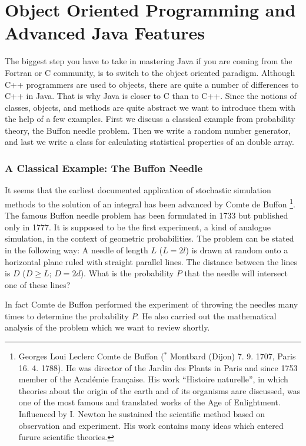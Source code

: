 \chapter{Object Oriented Programming and Advanced Java Features}
\label{sec:objectoriented}

The biggest step you have to take in mastering Java if you are
coming from the Fortran or C community, is to switch to the object
oriented paradigm. Although C++ programmers are used to objects, there
are quite a number of differences to C++ in Java. That is why Java
is closer to C than to C++. Since the notions of classes, objects, and
methods are quite abstract we want to introduce them with the help of
a few examples. First we discuss a classical example from probability theory,
the Buffon needle problem. Then we write a random number 
generator, and last we write a class for calculating 
statistical properties of an double array.  


\subsection{A Classical Example: The Buffon Needle}

It seems that the earliest documented application of stochastic simulation
methods to the solution of an integral has been advanced by Comte de
Buffon \footnote{Georges Loui Leclerc Comte de Buffon ($^*$ Montbard
  (Dijon) 7. 9. 1707, \dag Paris 16. 4. 1788). He was director of the
  Jardin des Plants in Paris and since 1753 member of the Acad\'emie 
fran\c{c}aise. His  work ``Histoire naturelle'', in which theories
about the origin of the earth and of  its organisms aare discussed,
was one of the most famous and translated works of the Age of
Enlightment. Influenced by I. Newton he sustained the scientific
method based on observation and experiment. His work contains many
ideas which entered furure scientific theories.}. The famous Buffon
needle problem has been formulated in 1733 but published only in 1777. It is
supposed
to be the first experiment, a kind of analogue simulation, in the
context of geometric probabilities. The problem can be stated in the
following way: A needle of length $L$ ($L=2l$) is drawn at random onto a
horizontal plane ruled with straight parallel lines. The distance
between the lines is $D$ ($D \ge L$; $D=2d$). 
What is the probability $P$ that the
needle will intersect one of these lines?

In fact Comte de Buffon performed the experiment of throwing the
needles many times to determine the probability $P$. He also carried
out the mathematical analysis of the problem which we want to review
shortly.

